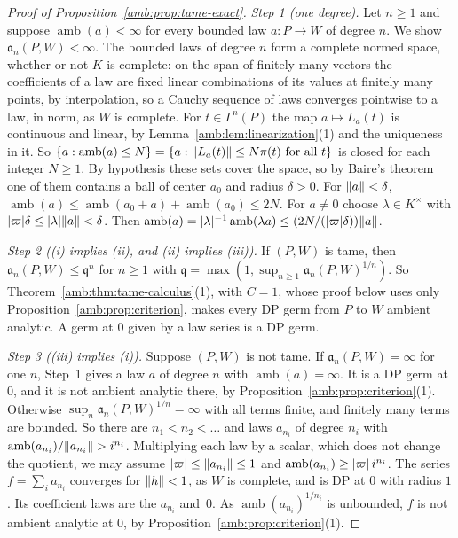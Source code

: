 \begin{proof}[Proof of Proposition~\ref{amb:prop:tame-exact}]
\emph{Step 1 (one degree).} Let $n\ge1$ and suppose $\operatorname{amb}(a)<\infty$ for every bounded law $a\colon P\to W$ of
degree $n$. We show $\mathfrak a_n(P,W)<\infty$. The bounded laws of degree $n$ form a complete normed space, whether or not $K$ is
complete: on the span of finitely many vectors the coefficients of a law are fixed linear combinations of its values at
finitely many points, by interpolation, so a Cauchy sequence of laws converges pointwise to a law, in norm, as $W$ is
complete. For $t\in\Gamma^n(P)$ the map $a\mapsto L_a(t)$ is continuous and linear, by Lemma~\ref{amb:lem:linearization}(1) and the uniqueness in it. So
$\{a:\operatorname{amb}(a)\le N\}=\{a:\lVert L_a(t)\rVert\le N\pi(t)\text{ for all }t\}$ is closed for each integer $N\ge1$. By
hypothesis these sets cover the space, so by Baire's theorem one of them contains a ball of center $a_0$ and radius
$\delta>0$. For $\lVert a\rVert<\delta$, $\operatorname{amb}(a)\le\operatorname{amb}(a_0+a)+\operatorname{amb}(a_0)\le2N$. For $a\ne0$ choose
$\lambda\in K^\times$ with $\lvert \varpi\rvert\delta\le\lvert \lambda\rvert\lVert a\rVert<\delta$. Then
$\operatorname{amb}(a)=\lvert \lambda\rvert^{-1}\operatorname{amb}(\lambda a)\le(2N/(\lvert \varpi\rvert\delta))\lVert a\rVert$.

\emph{Step 2 ((i) implies (ii), and (ii) implies (iii)).} If $(P,W)$ is tame, then $\mathfrak a_n(P,W)\le\mathfrak q^n$ for $n\ge1$ with $\mathfrak q=\max(1,\sup_{n\ge1}\mathfrak a_n(P,W)^{1/n})$. So Theorem~\ref{amb:thm:tame-calculus}(1), with $C=1$, whose proof below uses
only Proposition~\ref{amb:prop:criterion}, makes every DP germ from $P$ to $W$ ambient analytic. A germ at $0$ given by a law series
is a DP germ.

\emph{Step 3 ((iii) implies (i)).} Suppose $(P,W)$ is not tame. If $\mathfrak a_n(P,W)=\infty$ for one $n$, Step~1 gives a law $a$ of
degree $n$ with $\operatorname{amb}(a)=\infty$. It is a DP germ at $0$, and it is not ambient analytic there, by
Proposition~\ref{amb:prop:criterion}(1). Otherwise $\sup_n\mathfrak a_n(P,W)^{1/n}=\infty$ with all terms finite, and finitely many terms are bounded. So there are
$n_1<n_2<\dots$ and laws $a_{n_i}$ of degree $n_i$ with $\operatorname{amb}(a_{n_i})/\lVert a_{n_i}\rVert>i^{n_i}$. Multiplying each law by a scalar, which does not change the quotient, we may assume
$\lvert \varpi\rvert\le\lVert a_{n_i}\rVert\le1$ and $\operatorname{amb}(a_{n_i})\ge\lvert \varpi\rvert\,i^{n_i}$. The series $f=\sum_ia_{n_i}$ converges
for $\lVert h\rVert<1$, as $W$ is complete, and is DP at $0$ with radius $1$. Its coefficient laws are the $a_{n_i}$ and~$0$. As
$\operatorname{amb}(a_{n_i})^{1/n_i}$ is unbounded, $f$ is not ambient analytic at $0$, by
Proposition~\ref{amb:prop:criterion}(1).
\end{proof}

